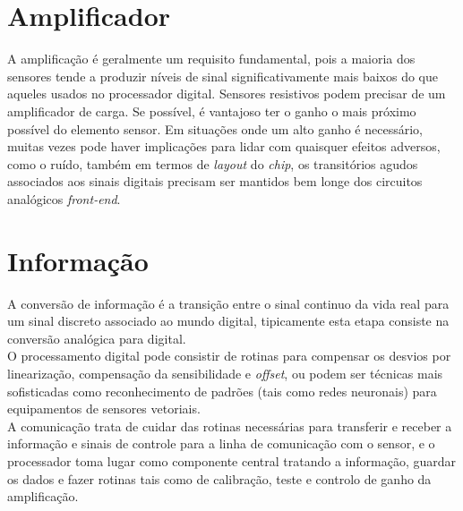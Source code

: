 \section{Amplificador}
A amplificação é geralmente um requisito fundamental, pois a maioria dos sensores tende a produzir níveis de sinal significativamente mais baixos do que aqueles usados no processador digital. Sensores resistivos podem precisar de um amplificador de carga. Se possível, é vantajoso ter o ganho o mais próximo possível do elemento sensor. Em situações onde um alto ganho é necessário, muitas vezes pode haver implicações para lidar 
com quaisquer efeitos adversos, como o ruído, também em termos de \textit{layout} do \textit{chip}, os transitórios agudos associados aos sinais digitais precisam ser mantidos bem longe dos circuitos analógicos \textit{front-end}. \cite{book-9}
\section{Informação}
A conversão de informação é a transição entre o sinal continuo da vida real para um sinal discreto associado ao mundo digital, tipicamente esta etapa consiste na conversão analógica para digital.
\\
O processamento digital pode consistir de rotinas para compensar os desvios por linearização, compensação da sensibilidade e \textit{offset}, ou podem ser técnicas mais sofisticadas como reconhecimento de padrões (tais como redes neuronais) para equipamentos de sensores vetoriais.\cite{book-9}
\\
A comunicação trata de cuidar das rotinas necessárias para transferir e receber a informação e sinais de controle para a linha de comunicação com o sensor, e o processador toma lugar como componente central tratando a informação, guardar os dados e fazer rotinas tais como de calibração, teste e controlo de ganho da amplificação. \cite{book-9}

